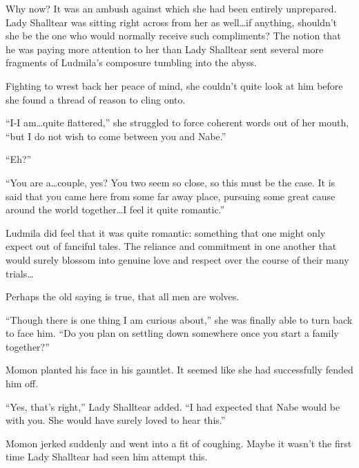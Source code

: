  

Why now? It was an ambush against which she had been entirely unprepared. Lady Shalltear was sitting right across from her as well…if anything, shouldn’t she be the one who would normally receive such compliments? The notion that he was paying more attention to her than Lady Shalltear sent several more fragments of Ludmila’s composure tumbling into the abyss.

 

Fighting to wrest back her peace of mind, she couldn’t quite look at him before she found a thread of reason to cling onto.

 

“I-I am…quite flattered,” she struggled to force coherent words out of her mouth, “but I do not wish to come between you and Nabe.”

 

“Eh?”

 

“You are a…couple, yes? You two seem so close, so this must be the case. It is said that you came here from some far away place, pursuing some great cause around the world together…I feel it quite romantic.”

 

Ludmila did feel that it was quite romantic: something that one might only expect out of fanciful tales. The reliance and commitment in one another that would surely blossom into genuine love and respect over the course of their many trials…

 

Perhaps the old saying is true, that all men are wolves.

 

“Though there is one thing I am curious about,” she was finally able to turn back to face him. “Do you plan on settling down somewhere once you start a family together?”

 

Momon planted his face in his gauntlet. It seemed like she had successfully fended him off.

 

“Yes, that’s right,” Lady Shalltear added. “I had expected that Nabe would be with you. She would have surely loved to hear this.”

 

Momon jerked suddenly and went into a fit of coughing. Maybe it wasn’t the first time Lady Shalltear had seen him attempt this.

 


